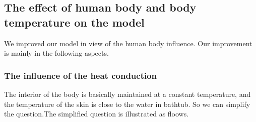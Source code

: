 \documentclass{mcmthesis}
\begin{document}
\subsection{The effect of human body and body temperature on the model}
We improved our model in view of the human body influence. Our improvement is mainly in the following aspects.
\subsubsection{The influence of the heat conduction}%
The interior of the body is basically maintained at a constant temperature, and the temperature of the skin is close to the water in bathtub. So we can simplify the question.The simplified question is illustrated as floows.\\
\end{document}
